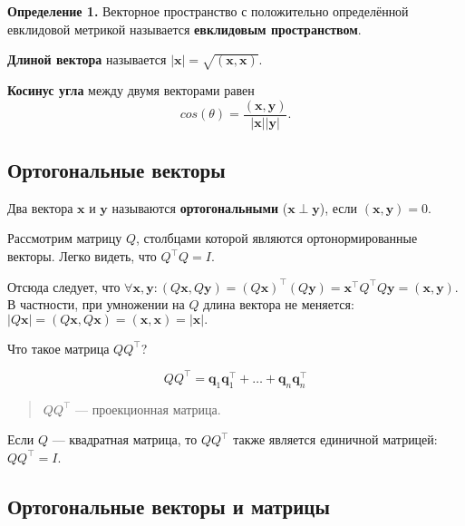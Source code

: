 \documentclass[11pt,a4paper]{article}
\begin{document}
\textbf{Определение 1.} Векторное пространство с положительно
определённой евклидовой метрикой называется \textbf{евклидовым
пространством}.

\textbf{Длиной вектора} называется
\(|\mathbf{x}| = \sqrt{(\mathbf{x}, \mathbf{x})}\).

\textbf{Косинус угла} между двумя векторами равен
\[ cos(\theta) = \frac{(\mathbf{x}, \mathbf{y})}{|\mathbf{x}| |\mathbf{y}|}. \]

    \hypertarget{ux43eux440ux442ux43eux433ux43eux43dux430ux43bux44cux43dux44bux435-ux432ux435ux43aux442ux43eux440ux44b}{%
\subsection{Ортогональные
векторы}\label{ux43eux440ux442ux43eux433ux43eux43dux430ux43bux44cux43dux44bux435-ux432ux435ux43aux442ux43eux440ux44b}}

Два вектора \(\mathbf{x}\) и \(\mathbf{y}\) называются
\textbf{ортогональными} (\(\mathbf{x} \perp \mathbf{y}\)), если
\((\mathbf{x}, \mathbf{y}) = 0\).

Рассмотрим матрицу \(Q\), столбцами которой являются ортонормированные
векторы. Легко видеть, что \(Q^\top Q = I\).

Отсюда следует, что
\(\forall \mathbf{x}, \mathbf{y}: (Q\mathbf{x}, Q\mathbf{y}) = (Q\mathbf{x})^\top (Q\mathbf{y}) = \mathbf{x}^\top Q^\top Q \mathbf{y} = (\mathbf{x}, \mathbf{y})\).
В частности, при умножении на \(Q\) длина вектора не меняется:
\(|Q\mathbf{x}| = (Q\mathbf{x}, Q\mathbf{x}) = (\mathbf{x}, \mathbf{x}) = |\mathbf{x}|.\)

Что такое матрица \(Q Q^\top\)?

\[
  Q Q^\top = \mathbf{q}_1 \mathbf{q}_1^\top + \ldots + \mathbf{q}_n \mathbf{q}_n^\top
\]

\begin{quote}
\(QQ^\top\) --- проекционная матрица.
\end{quote}

Если \(Q\) --- квадратная матрица, то \(Q Q^\top\) также является
единичной матрицей: \(Q Q^\top = I\).

    \hypertarget{ux43eux440ux442ux43eux433ux43eux43dux430ux43bux44cux43dux44bux435-ux432ux435ux43aux442ux43eux440ux44b-ux438-ux43cux430ux442ux440ux438ux446ux44b}{%
\subsection{Ортогональные векторы и
матрицы}\label{ux43eux440ux442ux43eux433ux43eux43dux430ux43bux44cux43dux44bux435-ux432ux435ux43aux442ux43eux440ux44b-ux438-ux43cux430ux442ux440ux438ux446ux44b}}
\end{document}
